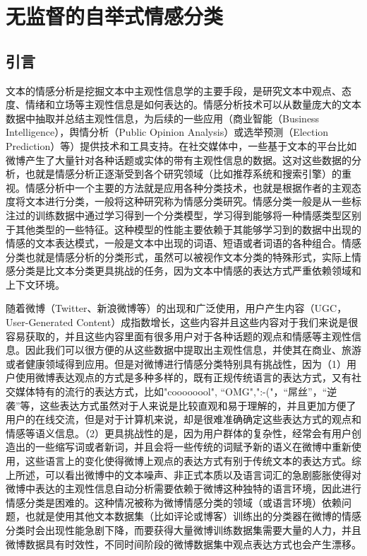 \chapter{无监督的自举式情感分类}
\label{ch4}

\section{引言}
\label{ch4_intr}
文本的情感分析是挖掘文本中主观性信息学的主要手段，是研究文本中观点、态度、情绪和立场等主观性信息是如何表达的。情感分析技术可以从数量庞大的文本数据中抽取并总结主观性信息，为后续的一些应用（商业智能（Business Intelligence），舆情分析（Public Opinion Analysis）或选举预测（Election Prediction）等）提供技术和工具支持。在社交媒体中，一些基于文本的平台比如微博产生了大量针对各种话题或实体的带有主观性信息的数据。这对这些数据的分析，也就是情感分析正逐渐受到各个研究领域（比如推荐系统和搜索引擎）的重视。情感分析中一个主要的方法就是应用各种分类技术，也就是根据作者的主观态度将文本进行分类，一般将这种研究称为情感分类研究。情感分类一般是从一些标注过的训练数据中通过学习得到一个分类模型，学习得到能够将一种情感类型区别于其他类型的一些特征。这种模型的性能主要依赖于其能够学习到的数据中出现的情感的文本表达模式，一般是文本中出现的词语、短语或者词语的各种组合。情感分类也就是情感分析的分类形式，虽然可以被视作文本分类的特殊形式，实际上情感分类是比文本分类更具挑战的任务，因为文本中情感的表达方式严重依赖领域和上下文环境。

随着微博（Twitter、新浪微博等）的出现和广泛使用，用户产生内容（UGC，User-Generated Content）成指数增长，这些内容并且这些内容对于我们来说是很容易获取的，并且这些内容里面有很多用户对于各种话题的观点和情感等主观性信息。因此我们可以很方便的从这些数据中提取出主观性信息，并使其在商业、旅游或者健康领域得到应用。但是对微博进行情感分类特别具有挑战性，因为（1）用户使用微博表达观点的方式是多种多样的，既有正规传统语言的表达方式，又有社交媒体特有的流行的表达方式，比如"coooooool", “OMG",":-("，“屌丝”，“逆袭”等，这些表达方式虽然对于人来说是比较直观和易于理解的，并且更加方便了用户的在线交流，但是对于计算机来说，却是很难准确确定这些表达方式的观点和情感等语义信息。（2）更具挑战性的是，因为用户群体的复杂性，经常会有用户创造出的一些缩写词或者新词，并且会将一些传统的词赋予新的语义在微博中重新使用，这些语言上的变化使得微博上观点的表达方式有别于传统文本的表达方式。综上所述，可以看出微博中的文本噪声、非正式本质以及语言词汇的急剧膨胀使得对微博中表达的主观性信息自动分析需要依赖于微博这种独特的语言环境，因此进行情感分类是困难的。这种情况被称为微博情感分类的领域（或语言环境）依赖问题，也就是使用其他文本数据集（比如评论或博客）训练出的分类器在微博的情感分类时会出现性能急剧下降，而要获得大量微博训练数据集需要大量的人力，并且微博数据具有时效性，不同时间阶段的微博数据集中观点表达方式也会产生漂移。

